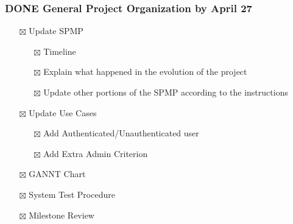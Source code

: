 \documentclass[11pt]{article}
\begin{document}
\subsubsection{{\bfseries\sffamily DONE} General Project Organization by April 27}
\label{sec:orgaeb727b}
\begin{itemize}
\item[{$\boxtimes$}] Update SPMP
\begin{itemize}
\item[{$\boxtimes$}] Timeline
\item[{$\boxtimes$}] Explain what happened in the evolution of the project
\item[{$\boxtimes$}] Update other portions of the SPMP according to the instructions
\end{itemize}
\item[{$\boxtimes$}] Update Use Cases
\begin{itemize}
\item[{$\boxtimes$}] Add Authenticated/Unauthenticated user
\item[{$\boxtimes$}] Add Extra Admin Criterion
\end{itemize}
\item[{$\boxtimes$}] GANNT Chart
\item[{$\boxtimes$}] System Test Procedure
\item[{$\boxtimes$}] Milestone Review
\end{itemize}
\end{document}
